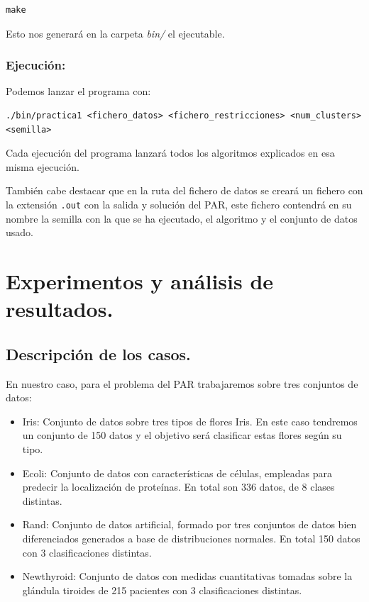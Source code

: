 \documentclass[12pt, spanish]{article}
\begin{document}
\begin{lstlisting}
make
\end{lstlisting}

Esto nos generará en la carpeta \textit{bin/} el ejecutable.


\subsubsection{Ejecución:}

Podemos lanzar el programa con:

\begin{lstlisting}
./bin/practica1 <fichero_datos> <fichero_restricciones> <num_clusters> <semilla>
\end{lstlisting}

Cada ejecución del programa lanzará todos los algoritmos explicados en esa misma ejecución.

También cabe destacar que en la ruta del fichero de datos se creará un fichero con la extensión \texttt{.out} con la salida y solución del PAR, este fichero contendrá en su nombre la semilla con la que se ha ejecutado, el algoritmo y el conjunto de datos usado.




\section{Experimentos y análisis de resultados.}


\subsection{Descripción de los casos.}

En nuestro caso, para el problema del PAR trabajaremos sobre tres conjuntos de datos:

\begin{itemize}
	\item{Iris: Conjunto de datos sobre tres tipos de flores Iris. En este caso tendremos un conjunto de 150 datos y el objetivo será clasificar estas flores según su tipo.}
	\item{Ecoli: Conjunto de datos con características de células, empleadas para predecir la localización de proteínas. En total son 336 datos, de 8 clases distintas.}
	\item{Rand: Conjunto de datos artificial, formado por tres conjuntos de datos bien diferenciados generados a base de distribuciones normales. En total 150 datos con 3 clasificaciones distintas.}
	\item{Newthyroid: Conjunto de datos con medidas cuantitativas tomadas sobre la glándula tiroides de 215 pacientes con 3 clasificaciones distintas.} 
\end{itemize}
\end{document}
